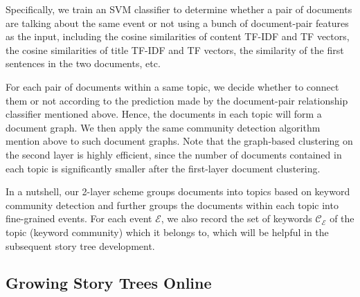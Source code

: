 Specifically, we train an SVM classifier to determine whether a pair of documents are talking about the same event or not using a bunch of document-pair features as the input, including the cosine similarities of content TF-IDF and TF vectors, the cosine similarities of title TF-IDF and TF vectors, the similarity of the first sentences in the two documents, etc.

For each pair of documents within a same topic, we decide whether to connect them or not according to the prediction made by the document-pair relationship classifier mentioned above. Hence, the documents in each topic will form a document graph. We then apply the same community detection algorithm mention above to such document graphs. 
Note that the graph-based clustering on the second layer is highly efficient, since the number of documents contained in each topic is significantly smaller after the first-layer document clustering. 

In a nutshell, our 2-layer scheme groups documents into topics based on keyword community detection and further groups the documents within each topic into fine-grained events. For each event $\mathcal{E}$, we also record the set of keywords $\mathcal{C}_{\mathcal{E}}$ of the topic (keyword community) which it belongs to, which will be helpful in the subsequent story tree development.


\subsection{Growing Story Trees Online}
\label{sec:tree}





